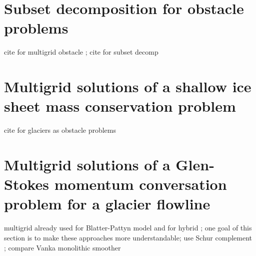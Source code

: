 \documentclass[letterpaper,final,12pt,reqno]{amsart}
\begin{document}
\section{Subset decomposition for obstacle problems} \label{sec:obstacle}


cite for multigrid obstacle \cite{BrandtCryer1983,Bueler2021,GraeserKornhuber2009,Jouvetetal2013}; cite for subset decomp \cite{Tai2003}

\section{Multigrid solutions of a shallow ice sheet mass conservation problem} \label{sec:sia}

cite for glaciers as obstacle problems \cite{Bueler2016,Bueler2020,Calvoetal2002,JouvetBueler2012}

\section{Multigrid solutions of a Glen-Stokes momentum conversation problem for a glacier flowline} \label{sec:stokes}

multigrid already used for Blatter-Pattyn model \cite{BrownSmithAhmadia2013} and for hybrid \cite{Jouvetetal2013}; one goal of this section is to make these approaches more understandable; use Schur complement \cite{Bueler2021,Elmanetal2014}; compare Vanka monolithic smoother \cite{Farrelletal2019}

\small

\bigskip


\end{document}
